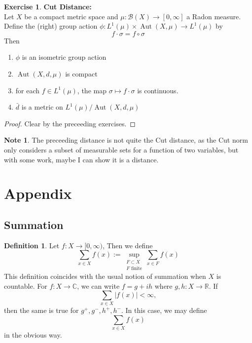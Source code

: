 \documentclass[12pt]{amsart}
\theoremstyle{definition}
\newtheorem{defn}[definition]{Definition}
\newtheorem{note}[definition]{Note}
\newtheorem{ex}[definition]{Exercise}
\newcommand{\sig}{\sigma}
\newcommand{\C}{\mathbb{C}}
\newcommand{\R}{\mathbb{R}}
\newcommand{\MB}{\mathcal{B}}
\newcommand{\tbf}[1]{\textbf{#1}}
\newcommand{\RG}{[0,\infty]}
\newcommand{\Rg}{[0,\infty)}
\DeclareMathOperator{\Aut}{Aut}
\DeclareMathOperator*{\0}{\mbf{0}}
\DeclareMathOperator*{\1}{\mbf{1}}
\newcommand{\lex}[1]{\label{ex:#1}}
\newcommand{\ld}[1]{\label{defn:#1}}
\begin{document}
	\begin{ex} \lex{} \tbf{Cut Distance:} \\
	Let $X$ be a compact metric space and $\mu:\MB(X) \rightarrow \RG$ a Radon measure. Define the (right) group action $\phi: L^1(\mu) \times \Aut(X, \mu) \rightarrow L^1(\mu) $ by 
	$$f \cdot \sig = f \circ \sig$$	
	Then 
	\begin{enumerate}
	\item $\phi$ is an isometric group action 
	\item $\Aut(X, d, \mu)$ is compact 
	\item for each $f \in L^1(\mu)$, the map $\sig \mapsto  f \cdot \sig$ is continuous.  
	\item $\bar{d}$ is a metric on $L^1(\mu) / \Aut(X, d, \mu)$
	\end{enumerate}
	\end{ex}
	
	\begin{proof}
	Clear by the preceeding exercises.
	\end{proof}
	
	\begin{note}
	The preceeding distance is not quite the Cut distance, as the Cut norm only considers a subset of measurable sets for a function of two variables, but with some work, maybe I can show it is a distance.
	\end{note}
	
	
	
	
	
	
	
	
	
	
	
	\newpage
	\section{Appendix}
	
	\subsection{Summation}
	
	\begin{defn} \ld{}
		Let $f:X \rightarrow \Rg$, Then we define $$\sum_{x \in X} f(x) := \sup_{\substack{F \subset X \\ F \text{ finite}}} \sum_{x \in F} f(x)$$ This definition coincides with the usual notion of summation when $X$ is countable. For $f:X \rightarrow \C$, we can write $f = g +ih$ where $g,h:X \rightarrow \R$. If $$\sum_{x \in X}|f(x)| < \infty,$$ then the same is true for $g^+,g^-,h^+,h^-$. In this case, we may define $$\sum_{x \in X} f(x)$$ in the obvious way.
	\end{defn} 
	
\end{document}
